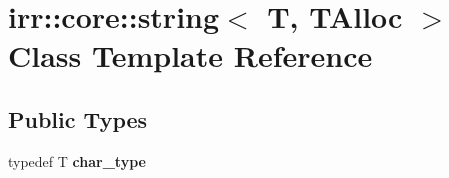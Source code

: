 \hypertarget{classirr_1_1core_1_1string}{}\section{irr\+:\+:core\+:\+:string$<$ T, T\+Alloc $>$ Class Template Reference}
\label{classirr_1_1core_1_1string}
\subsection*{Public Types}
\begin{DoxyCompactItemize}
\item 
typedef T {\bfseries char\+\_\+type}\hypertarget{classirr_1_1core_1_1string_aa29e2f7804a44a4040202083366bf807}{}\label{classirr_1_1core_1_1string_aa29e2f7804a44a4040202083366bf807}

\end{DoxyCompactItemize}
